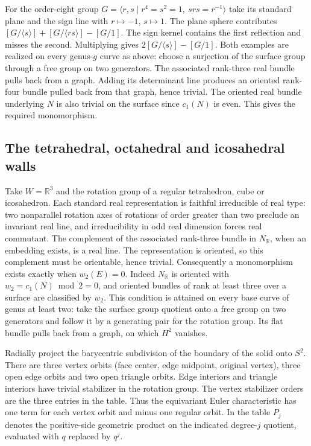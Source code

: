 For the order-eight group \(G=\langle r,s\mid r^4=s^2=1,\ srs=r^{-1}\rangle\) take its standard plane and the sign line with \(r\mapsto-1\), \(s\mapsto1\). The plane sphere contributes \([G/\langle s\rangle]+[G/\langle rs\rangle]-[G/1]\). The sign kernel contains the first reflection and misses the second. Multiplying gives \(2[G/\langle s\rangle]-[G/1]\). Both examples are realized on every genus-\(g\) curve as above: choose a surjection of the surface group through a free group on two generators. The associated rank-three real bundle pulls back from a graph. Adding its determinant line produces an oriented rank-four bundle pulled back from that graph, hence trivial. The oriented real bundle underlying \(N\) is also trivial on the surface since \(c_1(N)\) is even. This gives the required monomorphism.

\subsection{The tetrahedral, octahedral and icosahedral walls}

Take \(W=\mathbb R^3\) and the rotation group of a regular tetrahedron, cube or icosahedron. Each standard real representation is faithful irreducible of real type: two nonparallel rotation axes of rotations of order greater than two preclude an invariant real line, and irreducibility in odd real dimension forces real commutant. The complement of the associated rank-three bundle in \(N_{\mathbb R}\), when an embedding exists, is a real line. The representation is oriented, so this complement must be orientable, hence trivial. Consequently a monomorphism exists exactly when \(w_2(E)=0\). Indeed \(N_{\mathbb R}\) is oriented with \(w_2=c_1(N)\bmod 2=0\), and oriented bundles of rank at least three over a surface are classified by \(w_2\). This condition is attained on every base curve of genus at least two: take the surface group quotient onto a free group on two generators and follow it by a generating pair for the rotation group. Its flat bundle pulls back from a graph, on which \(H^2\) vanishes.

Radially project the barycentric subdivision of the boundary of the solid onto \(S^2\). There are three vertex orbits (face center, edge midpoint, original vertex), three open edge orbits and two open triangle orbits. Edge interiors and triangle interiors have trivial stabilizer in the rotation group. The vertex stabilizer orders are the three entries in the table. Thus the equivariant Euler characteristic has one term for each vertex orbit and minus one regular orbit. In the table \(P_j\) denotes the positive-side geometric product on the indicated degree-\(j\) quotient, evaluated with \(q\) replaced by \(q^j\).

